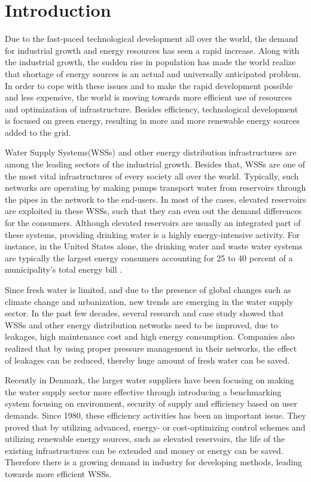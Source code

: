 \chapter{Introduction}
\label{introduction}

Due to the fast-paced technological development all over the world, the demand for industrial growth and energy resources has seen a rapid increase. Along with the industrial growth, the sudden rise in population has made the world realize that shortage of energy sources is an actual and universally anticipated problem. In order to cope with these issues and to make the rapid development possible and less expensive, the world is moving towards more efficient use of resources and optimization of infrastructure. Besides efficiency, technological development is focused on green energy, resulting in more and more renewable energy sources added to the grid. 

Water Supply Systems(WSSs) and other energy distribution infrastructures are among the leading sectors of the industrial growth. Besides that, WSSs are one of the most vital infrastructures of every society all over the world. Typically, such networks are operating by making pumps transport water from reservoirs through the pipes in the network to the end-users. In most of the cases, elevated reservoirs are exploited in these WSSs, such that they can even out the demand differences for the consumers. Although elevated reservoirs are usually an integrated part of these systems, providing drinking water is a highly energy-intensive activity. For instance, in the United States alone, the drinking water and waste water systems are typically the largest energy consumers accounting for 25 to 40 percent of a municipality's total energy bill \cite{fluctuating_price}. 

Since fresh water is limited, and due to the presence of global changes such as climate change and urbanization, new trends are emerging in the water supply sector. In the past few decades, several research and case study showed that WSSs and other energy distribution networks need to be improved, due to leakages, high maintenance cost and high energy consumption. Companies also realized that by using proper pressure management in their networks, the effect of leakages can be reduced, thereby huge amount of fresh water can be saved. 

Recently in Denmark, the larger water suppliers have been focusing on making the water supply sector more effective through introducing a benchmarking system focusing on environment, security of supply and efficiency based on user demands. Since 1980, these efficiency activities has been an important issue. They proved that by utilizing advanced, energy- or cost-optimizing control schemes and utilizing renewable energy sources, such as elevated reservoirs, the life of the existing infrastructures can be extended and money or energy can be saved. Therefore there is a growing demand in industry for developing methods, leading towards more efficient WSSs. 

